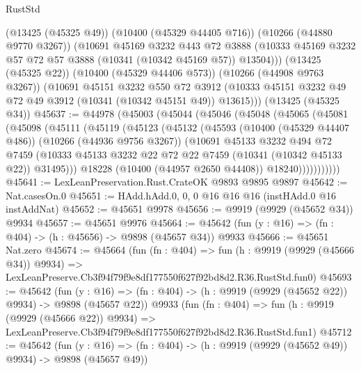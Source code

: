 \begin{lexlean}{RustStd}
\begin{coremodule}
        (@13425 (@45325 @49))
        (@10400 (@45329 @44405 @716))
        (@10266 (@44880 @9770 @3267))
        (@10691
          @45169
          @3232
          @443
          @72
          @3888
          (@10333 @45169 @3232 @57 @72 @57 @3888 (@10341 (@10342 @45169 @57)) @13504)))
      (@13425 (@45325 @22))
      (@10400 (@45329 @44406 @573))
      (@10266 (@44908 @9763 @3267))
      (@10691
        @45151
        @3232
        @550
        @72
        @3912
        (@10333 @45151 @3232 @49 @72 @49 @3912 (@10341 (@10342 @45151 @49)) @13615)))
    (@13425 (@45325 @34))
@45637 := @44978
    (@45003
      (@45044
        (@45046
          (@45048
            (@45065
              (@45081
                (@45098
                  (@45111
                    (@45119
                      (@45123
                        (@45132
                          (@45593
                            (@10400 (@45329 @44407 @486))
                            (@10266 (@44936 @9756 @3267))
                            (@10691
                              @45133
                              @3232
                              @494
                              @72
                              @7459
                              (@10333
                                @45133
                                @3232
                                @22
                                @72
                                @22
                                @7459
                                (@10341 (@10342 @45133 @22))
                                @31495)))
                          @18228
                          (@10400 (@44957 @2650 @44408))
                          @18240)))))))))))
@45641 := LexLeanPreservation.Rust.CrateOK @9893 @9895 @9897
@45642 := Nat.casesOn.{0}
@45651 := HAdd.hAdd.{0, 0, 0} @16 @16 @16 (instHAdd.{0} @16 instAddNat)
@45652 := @45651 @9978
@45656 := @9919 (@9929 (@45652 @34)) @9934
@45657 := @45651 @9976
@45664 := @45642 (fun (y : @16) => (fn : @404) -> (h : @45656) -> @9898 (@45657 @34)) @9933
@45666 := @45651 Nat.zero
@45674 := @45664
    (fun (fn : @404) =>
    fun (h : @9919 (@9929 (@45666 @34)) @9934) =>
    LexLeanPreserve.Cb3f94f79f9e8df177550f627f92bd8d2.R36.RustStd.fun0)
@45693 := @45642
    (fun (y : @16) => (fn : @404) -> (h : @9919 (@9929 (@45652 @22)) @9934) -> @9898 (@45657 @22))
    @9933
    (fun (fn : @404) =>
    fun (h : @9919 (@9929 (@45666 @22)) @9934) =>
    LexLeanPreserve.Cb3f94f79f9e8df177550f627f92bd8d2.R36.RustStd.fun1)
@45712 := @45642
    (fun (y : @16) => (fn : @404) -> (h : @9919 (@9929 (@45652 @49)) @9934) -> @9898 (@45657 @49))

\end{coremodule}
\end{lexlean}
